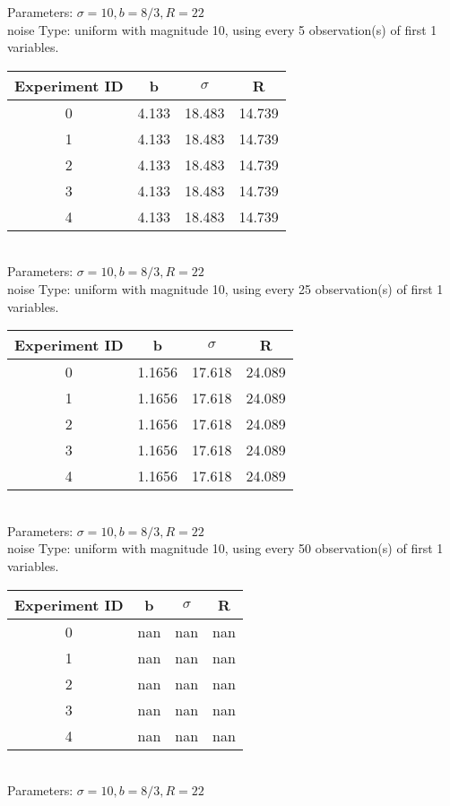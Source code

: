 \begin{multicols}{3}
Parameters: $\sigma=10, b=8/3, R=22$\\
noise Type: uniform with magnitude 10, using every 5 observation(s) of first 1 variables.\\
\begin{tabular}{cccc}
\hline Experiment ID & b & $\sigma$ & R \\ \hline 
0 & 4.133 & 18.483 & 14.739\\ \hline 
 1 & 4.133 & 18.483 & 14.739\\ \hline 
 2 & 4.133 & 18.483 & 14.739\\ \hline 
 3 & 4.133 & 18.483 & 14.739\\ \hline 
 4 & 4.133 & 18.483 & 14.739\\ \hline 
 \end{tabular}\\
Parameters: $\sigma=10, b=8/3, R=22$\\
noise Type: uniform with magnitude 10, using every 25 observation(s) of first 1 variables.\\
\begin{tabular}{cccc}
\hline Experiment ID & b & $\sigma$ & R \\ \hline 
0 & 1.1656 & 17.618 & 24.089\\ \hline 
 1 & 1.1656 & 17.618 & 24.089\\ \hline 
 2 & 1.1656 & 17.618 & 24.089\\ \hline 
 3 & 1.1656 & 17.618 & 24.089\\ \hline 
 4 & 1.1656 & 17.618 & 24.089\\ \hline 
 \end{tabular}\\
Parameters: $\sigma=10, b=8/3, R=22$\\
noise Type: uniform with magnitude 10, using every 50 observation(s) of first 1 variables.\\
\begin{tabular}{cccc}
\hline Experiment ID & b & $\sigma$ & R \\ \hline 
0 & nan & nan & nan\\ \hline 
 1 & nan & nan & nan\\ \hline 
 2 & nan & nan & nan\\ \hline 
 3 & nan & nan & nan\\ \hline 
 4 & nan & nan & nan\\ \hline 
 \end{tabular}\\
Parameters: $\sigma=10, b=8/3, R=22$\\

\end{multicols}
